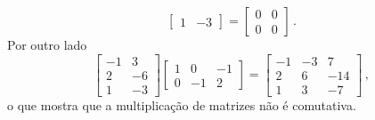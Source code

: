 \documentclass[12pt,a4paper]{report}
\begin{document}
\begin{enumerate}
$$\begin{bmatrix}
    1&-3
  \end{bmatrix}=\begin{bmatrix}
    0&0\\
    0&0
  \end{bmatrix}\,.$$
  Por outro lado
  $$\begin{bmatrix}
    -1&3\\
    2&-6\\
    1&-3
  \end{bmatrix}\begin{bmatrix}
    1&0&-1\\
    0&-1&2
  \end{bmatrix}=\begin{bmatrix}
    -1&-3&7\\
    2&6&-14\\
    1&3&-7
  \end{bmatrix}\,,$$
  o que mostra que a multiplicação de matrizes não é comutativa.
\end{enumerate}
\end{document}
